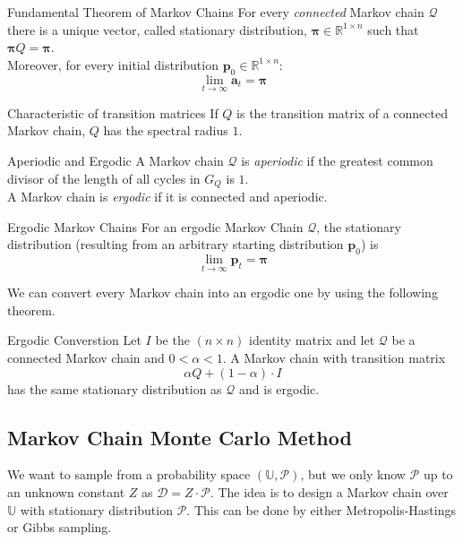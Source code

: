 \documentclass[english]{panikzettel}
\begin{document}
\begin{theo}{Fundamental Theorem of Markov Chains}
For every \emph{connected} Markov chain $\mathcal{Q}$ there is a unique vector, called stationary distribution, $\boldsymbol{\pi} \in \mathbb{R}^{1 \times n}$ such that $\boldsymbol{\pi} Q = \boldsymbol{\pi}$.\\
Moreover, for every initial distribution $\textbf{p}_0 \in \mathbb{R}^{1 \times n}$:
$$
\lim_{t \rightarrow \infty} \textbf{a}_t = \boldsymbol{\pi}
$$
\end{theo}

\begin{theo}{Characteristic of transition matrices}
If $Q$ is the transition matrix of a connected Markov chain, $Q$ has the spectral radius $1$.
\end{theo}

\begin{defi}{Aperiodic and Ergodic}
A Markov chain $\mathcal{Q}$ is \emph{aperiodic} if the greatest common divisor of the length of all cycles in $G_Q$ is $1$.\\
A Markov chain is \emph{ergodic} if it is connected and aperiodic.
\end{defi}

\begin{halfboxl}
\vspace{-\baselineskip}
\begin{theo}{Ergodic Markov Chains}
For an ergodic Markov Chain $\mathcal{Q}$, the stationary distribution (resulting from an arbitrary starting distribution $\textbf{p}_0$) is
$$
\lim_{t \rightarrow \infty} \textbf{p}_t = \boldsymbol{\pi}
$$
\end{theo}

We can convert every Markov chain into an ergodic one by using the following theorem.
\end{halfboxl}
\begin{halfboxr}
\vspace{-\baselineskip}

\begin{theo}{Ergodic Converstion}
Let $I$ be the $(n\times n)$ identity matrix and let $\mathcal{Q}$ be a connected Markov chain and $0 < \alpha < 1$. A Markov chain with transition matrix
\[
\alpha Q + (1 - \alpha)\cdot I
\]
has the same stationary distribution as $\mathcal{Q}$ and is ergodic.
\end{theo}

\end{halfboxr}

\subsection{Markov Chain Monte Carlo Method}
We want to sample from a probability space $(\mathbb{U}, \mathcal{P})$, but we only know $\mathcal{P}$ up to an unknown constant $Z$ as $\mathcal{D} = Z \cdot \mathcal{P}$.
The idea is to design a Markov chain over $\mathbb{U}$ with stationary distribution $\mathcal{P}$.
This can be done by either Metropolis-Hastings or Gibbs sampling.
\end{document}
